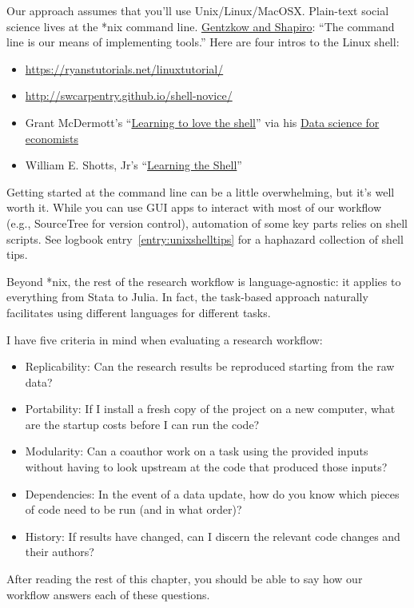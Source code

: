 Our approach assumes that you'll use Unix/Linux/MacOSX.
Plain-text social science lives at the *nix command line.
\href{https://github.com/gslab-econ/ra-manual/wiki/Getting-Started}{Gentzkow and Shapiro}: ``The command line is our means of implementing tools.''
Here are four intros to the Linux shell:
\begin{itemize}
	\item \url{https://ryanstutorials.net/linuxtutorial/}
	\item \url{http://swcarpentry.github.io/shell-novice/}
	\item Grant McDermott's ``\href{https://raw.githack.com/uo-ec607/lectures/master/03-shell/03-shell.html\#1}{Learning to love the shell}'' via his \href{https://github.com/uo-ec607/lectures}{Data science for economists}
	\item William E. Shotts, Jr's ``\href{http://linuxcommand.org/lc3_learning_the_shell.php}{Learning the Shell}''
\end{itemize}
Getting started at the command line can be a little overwhelming, but it's well worth it.
While you can use GUI apps to interact with most of our workflow (e.g., SourceTree for version control),
automation of some key parts relies on shell scripts.
See logbook entry~\ref{entry:unixshelltips} for a haphazard collection of shell tips.

Beyond *nix, the rest of the research workflow is language-agnostic:
it applies to everything from Stata to Julia.
In fact, the task-based approach naturally facilitates using different languages for different tasks.

I have five criteria in mind when evaluating a research workflow:
\begin{itemize}
\item Replicability:
Can the research results be reproduced starting from the raw data?
\item Portability:
If I install a fresh copy of the project on a new computer, what are the startup costs before I can run the code?
\item Modularity:
Can a coauthor work on a task using the provided inputs without having to look upstream at the code that produced those inputs?
\item Dependencies:
In the event of a data update, how do you know which pieces of code need to be run (and in what order)?
\item History:
If results have changed, can I discern the relevant code changes and their authors?
\end{itemize}
After reading the rest of this chapter, you should be able to say how our workflow answers each of these questions.
